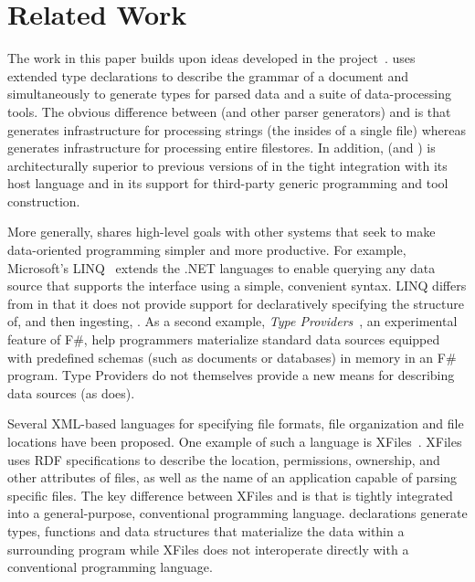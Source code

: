 \section{Related Work}
\label{sec:related}

The work in this paper builds upon ideas developed in the \pads{} 
project~\cite{fisher+:pads,fisher+:toplas}. \pads{} uses extended
type declarations to describe the grammar of a document
and simultaneously to generate types for parsed data and a suite 
of data-processing tools.  The obvious difference between 
\pads{} (and other parser generators) and
\forest{} is that 
\pads{} generates infrastructure for processing strings (the insides
of a single file) whereas \forest{} generates infrastructure for 
processing entire filestores.  In addition,
\forest{} (and \padshaskell) is architecturally superior to 
previous versions of \pads{} in the tight integration with its host
language and
in its support for third-party generic programming and tool construction.

More generally, \forest{} shares high-level goals with other systems
that seek to make data-oriented programming simpler and more productive.
For example, Microsoft's LINQ~\cite{linq} extends the .NET languages
to enable querying
any data source that supports the  interface using
a simple, convenient syntax.  
LINQ differs from \forest{} in that it does not provide support for
declaratively specifying the structure of, and then ingesting, 
\filestores{}. As a second example,
{\em Type Providers}~\cite{syme+:type-providers}, an
experimental feature 
of F\#, help programmers materialize standard data sources equipped with
predefined schemas (such as \xml{} documents or databases) in memory in
an F\# program.  Type Providers
do not themselves provide a new means for describing data sources (as
\forest{} does). 

Several XML-based languages for specifying file formats, file
organization and file locations have been proposed. One example of
such a language is XFiles~\cite{xml-file-sys}.  XFiles uses RDF
specifications to describe the location, permissions, ownership, and
other attributes of files, as well as the name of an application
capable of parsing specific files.  The key difference between XFiles
and \forest{} is that \forest{} is tightly integrated into a
general-purpose, conventional programming language.  \forest{}
declarations generate types, functions and data structures that
materialize the data within a surrounding \haskell{} program while
XFiles does not interoperate directly with a conventional programming
language.

